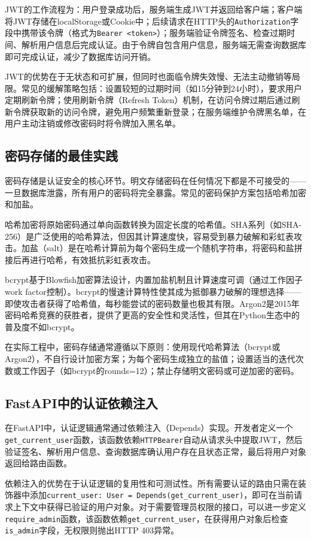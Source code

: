 \documentclass[12pt,a4paper]{ctexart}
\begin{document}
JWT的工作流程为：用户登录成功后，服务端生成JWT并返回给客户端；客户端将JWT存储在localStorage或Cookie中；后续请求在HTTP头的\texttt{Authorization}字段中携带该令牌（格式为\texttt{Bearer <token>}）；服务端验证令牌签名、检查过期时间、解析用户信息后完成认证。由于令牌自包含用户信息，服务端无需查询数据库即可完成认证，减少了数据库访问开销。

JWT的优势在于无状态和可扩展，但同时也面临令牌失效慢、无法主动撤销等局限。常见的缓解策略包括：设置较短的过期时间（如15分钟到24小时），要求用户定期刷新令牌；使用刷新令牌（Refresh Token）机制，在访问令牌过期后通过刷新令牌获取新的访问令牌，避免用户频繁重新登录；在服务端维护令牌黑名单，在用户主动注销或修改密码时将令牌加入黑名单。

\subsection{密码存储的最佳实践}

密码存储是认证安全的核心环节。明文存储密码在任何情况下都是不可接受的——一旦数据库泄露，所有用户的密码将完全暴露。常见的密码保护方案包括哈希加密和加盐。

哈希加密将原始密码通过单向函数转换为固定长度的哈希值。SHA系列（如SHA-256）是广泛使用的哈希算法，但因其计算速度快，容易受到暴力破解和彩虹表攻击。加盐（salt）是在哈希计算前为每个密码生成一个随机字符串，将密码和盐拼接后再进行哈希，有效抵抗彩虹表攻击。

bcrypt基于Blowfish加密算法设计，内置加盐机制且计算速度可调（通过工作因子work factor控制）。bcrypt的慢速计算特性使其成为抵御暴力破解的理想选择——即使攻击者获得了哈希值，每秒能尝试的密码数量也极其有限。Argon2是2015年密码哈希竞赛的获胜者，提供了更高的安全性和灵活性，但其在Python生态中的普及度不如bcrypt。

在实际工程中，密码存储通常遵循以下原则：使用现代哈希算法（bcrypt或Argon2），不自行设计加密方案；为每个密码生成独立的盐值；设置适当的迭代次数或工作因子（如bcrypt的rounds=12）；禁止存储明文密码或可逆加密的密码。

\subsection{FastAPI中的认证依赖注入}

在FastAPI中，认证逻辑通常通过依赖注入（Depends）实现。开发者定义一个\texttt{get\_current\_user}函数，该函数依赖\texttt{HTTPBearer}自动从请求头中提取JWT，然后验证签名、解析用户信息、查询数据库确认用户存在且状态正常，最后将用户对象返回给路由函数。

依赖注入的优势在于认证逻辑的复用性和可测试性。所有需要认证的路由只需在装饰器中添加\texttt{current\_user: User = Depends(get\_current\_user)}，即可在当前请求上下文中获得已验证的用户对象。对于需要管理员权限的接口，可以进一步定义\texttt{require\_admin}函数，该函数依赖\texttt{get\_current\_user}，在获得用户对象后检查\texttt{is\_admin}字段，无权限则抛出HTTP 403异常。
\end{document}
